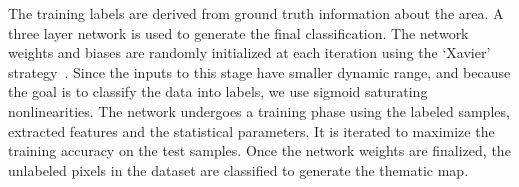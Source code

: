 The training labels are derived from ground truth information about the area. 
A three layer network is used to generate the final classification. The network weights and biases are randomly initialized at each iteration using the `Xavier' strategy~\cite{glorot2010understanding}. Since the inputs to this stage have smaller dynamic range, and because the goal is to classify the data into labels, we use sigmoid saturating nonlinearities.   
The network undergoes a training phase using the  labeled samples, extracted features and the statistical parameters. It is iterated to maximize the training accuracy on the test samples. Once the network weights are finalized, the unlabeled pixels in the dataset are classified to generate the  thematic map. 
